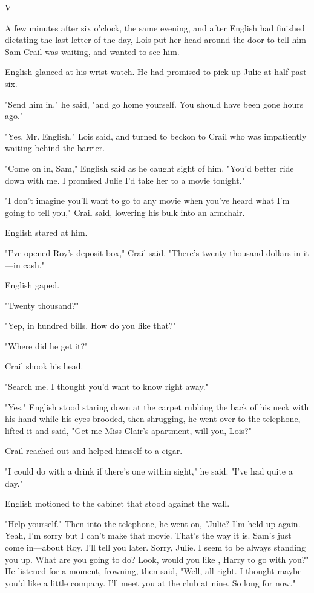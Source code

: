 \documentclass{novel}
\begin{document}
V

A few minutes after six o'clock, the same evening, and after English had finished dictating the last letter of the day, Lois put her head around the door to tell him Sam Crail was waiting, and wanted to see him.

English glanced at his wrist watch. He had promised to pick up Julie at half past six.

"Send him in," he said, "and go home yourself. You should have been gone hours ago."

"Yes, Mr. English," Lois said, and turned to beckon to Crail who was impatiently waiting behind the barrier.

"Come on in, Sam," English said as he caught sight of him. "You'd better ride down with me. I promised Julie I'd take her to a movie tonight."

"I don't imagine you'll want to go to any movie when you've heard what I'm going to tell you," Crail said, lowering his bulk into an armchair.

English stared at him.

"I've opened Roy's deposit box," Crail said. "There's twenty thousand dollars in it—in cash."

English gaped.

"Twenty thousand?"

"Yep, in hundred bills. How do you like that?"

"Where did he get it?"

Crail shook his head.

"Search me. I thought you'd want to know right away."

"Yes." English stood staring down at the carpet rubbing the back of his neck with his hand while his eyes brooded, then shrugging, he went over to the telephone, lifted it and said, "Get me Miss Clair's apartment, will you, Lois?"

Crail reached out and helped himself to a cigar.

"I could do with a drink if there's one within sight," he said. "I've had quite a day."

English motioned to the cabinet that stood against the wall.

"Help yourself." Then into the telephone, he went on, "Julie? I'm held up again. Yeah, I'm sorry but I can't make that movie. That's the way it is. Sam's just come in—about Roy. I'll tell you later. Sorry, Julie. I seem to be always standing you up. What are you going to do? Look, would you like , Harry to go with you?" He listened for a moment, frowning, then said, "Well, all right. I thought maybe you'd like a little company. I'll meet you at the club at nine. So long for now."
\end{document}
